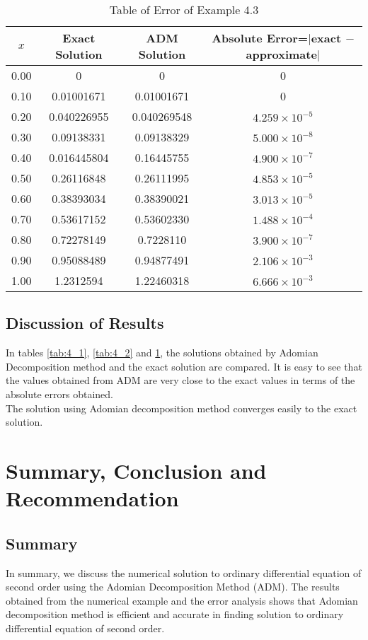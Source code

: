 \documentclass[11pt]{report}
\newcommand{\NI}{\noindent}
\begin{document}
	\newpage
	\begin{table}[!h]
		\centering 
		\caption{Table of Error of Example 4.3}\label{tab:4_3}
		\begin{tabular}{|c|c|c|c|}
			\hline
			$x$ & Exact Solution & ADM Solution & Absolute Error=$|$exact $-$ approximate$|$\\\hline
			0.00 & 0 & 0 & 0\\
			0.10 & 0.01001671 & 0.01001671 & 0\\
			0.20 & 0.040226955 & 0.040269548 & $4.259\times10^{-5}$\\
			0.30 & 0.09138331 & 0.09138329 & $5.000\times10^{-8}$\\
			0.40 & 0.016445804 & 0.16445755 & $4.900\times10^{-7}$\\
			0.50 & 0.26116848 & 0.26111995 & $4.853\times10^{-5}$\\
			0.60 & 0.38393034 & 0.38390021 & $3.013\times10^{-5}$\\
			0.70 & 0.53617152 & 0.53602330 & $1.488\times10^{-4}$\\
			0.80 & 0.72278149 & 0.7228110 & $3.900\times10^{-7}$\\
			0.90 & 0.95088489 & 0.94877491 & $2.106\times10^{-3}$\\
			1.00 & 1.2312594 & 1.22460318 & $6.666\times10^{-3}$\\\hline		
		\end{tabular}
	\end{table}
	\section{Discussion of Results}
	In tables \ref{tab:4_1}, \ref{tab:4_2} and \ref{tab:4_3}, the solutions obtained by Adomian Decomposition method and the exact solution are compared. It is easy to see that the values obtained from ADM are very close to the exact values in terms of the absolute errors obtained.\\
	
	\NI The solution using Adomian decomposition method converges easily to the exact solution.
	
	\chapter{Summary, Conclusion and Recommendation}
	\section{Summary}
	In summary, we discuss the numerical solution to ordinary differential equation of second order using the Adomian Decomposition Method (ADM). The results obtained from the numerical example and the error analysis shows that Adomian decomposition method is efficient and accurate in finding solution to ordinary differential equation of second order.
	
\end{document}
